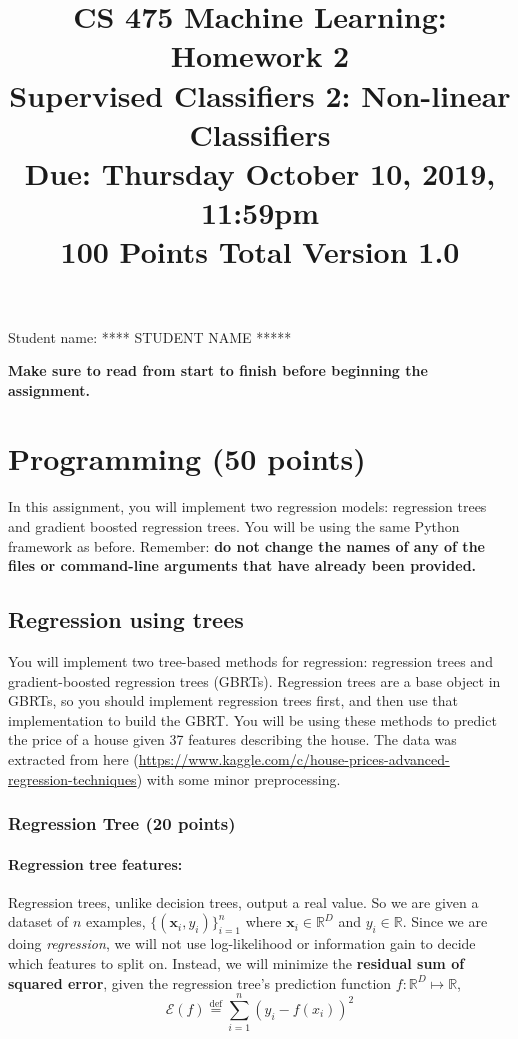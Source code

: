 \documentclass[11pt]{article}
\title{CS 475 Machine Learning: Homework 2\\
Supervised Classifiers 2: Non-linear Classifiers\\
\Large{Due: Thursday October 10, 2019, 11:59pm}\\
100 Points Total \hspace{1cm} Version 1.0}
\author{}
\date{}
\newcommand{\defeq}{\overset{\text{def}}{=}}
\begin{document}
\large
\maketitle
\thispagestyle{headings}

\vspace{-.5in}


\begin{answertext}{2cm}{}\centering
  Student name:  **** STUDENT NAME *****\\

\end{answertext}

{\bf Make sure to read from start to finish before beginning the assignment.}
\section{Programming (50 points)}
In this assignment, you will implement two regression models: regression trees and gradient boosted regression trees.
You will be using the same Python framework as before. Remember: \textbf{do not change the names of any of the files or command-line arguments that have already been provided.}

\subsection{Regression using trees}
You will implement two tree-based methods for regression: regression trees and gradient-boosted regression trees (GBRTs). Regression trees are a base object in GBRTs, so you should implement regression trees first, and then use that implementation to build the GBRT. You will be using these methods to predict the price of a house given 37 features describing the house. The data was extracted from here (\url{https://www.kaggle.com/c/house-prices-advanced-regression-techniques}) with some minor preprocessing.


\subsubsection{Regression Tree (20 points)}
\paragraph{Regression tree features:}

Regression trees, unlike decision trees, output a real value.  So we are given a
dataset of $n$ examples, $\{ (\boldsymbol{x}_i, y_i) \}^n_{i=1}$ where
$\boldsymbol{x}_i \in \mathbb{R}^D$ and $y_i \in \mathbb{R}$.  Since we are
doing \emph{regression}, we will not use log-likelihood or information gain to
decide which features to split on.  Instead, we will minimize the
\textbf{residual sum of squared error}, given the regression tree's prediction
function $f: \mathbb{R}^D \mapsto \mathbb{R}$,
\begin{equation}\label{eq:rss}
  \mathcal{E}(f) \defeq \sum_{i=1}^n (y_i - f(x_i))^2
\end{equation}
\end{document}
